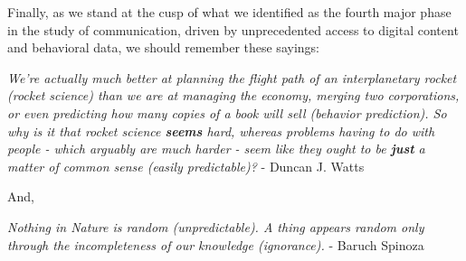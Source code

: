 Finally, as we stand at the cusp of what we identified as the fourth major phase in the study of communication, driven by unprecedented access to digital content and behavioral data, we should remember these sayings:

\textit{We're actually much better at planning the flight path of an interplanetary rocket (rocket science) than we are at managing the economy, merging two corporations, or even predicting how many copies of a book will sell (behavior prediction). So why is it that rocket science \textbf{seems} hard, whereas problems having to do with people - which arguably are much harder - seem like they ought to be \textbf{just} a matter of common sense (easily predictable)?} - Duncan J. Watts       

\begin{center}
    And,
\end{center}

\textit{Nothing in Nature is random (unpredictable). A thing appears random only through the incompleteness of our knowledge (ignorance).} - Baruch Spinoza
